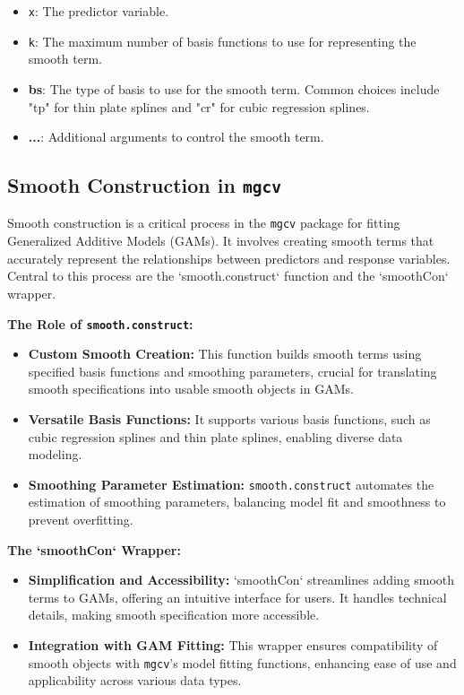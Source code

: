 \documentclass[12pt, twoside,hidelinks]{article}
\theoremstyle{definition}
\numberwithin{equation}{section}
\begin{document}
\begin{itemize}
  \item \texttt{x}: The predictor variable.
  \item \texttt{k}: The maximum  number of basis functions to use for representing the smooth term.
  \item \textbf{bs}: The type of basis to use for the smooth term. Common choices include "tp" for thin plate splines and "cr" for cubic regression splines.
  \item \textbf{...}: Additional arguments to control the smooth term.
\end{itemize}


\subsection{Smooth Construction in \texttt{mgcv}}

Smooth construction is a critical process in the \texttt{mgcv} package for fitting Generalized Additive Models (GAMs). It involves creating smooth terms that accurately represent the relationships between predictors and response variables. Central to this process are the `smooth.construct` function and the `smoothCon` wrapper.

\textbf{The Role of \texttt{smooth.construct}:}
\begin{itemize}
    \item \textbf{Custom Smooth Creation:} This function builds smooth terms using specified basis functions and smoothing parameters, crucial for translating smooth specifications into usable smooth objects in GAMs.
    
    \item \textbf{Versatile Basis Functions:} It supports various basis functions, such as cubic regression splines and thin plate splines, enabling diverse data modeling.
    
    \item \textbf{Smoothing Parameter Estimation:} \texttt{smooth.construct} automates the estimation of smoothing parameters, balancing model fit and smoothness to prevent overfitting.
\end{itemize}

\textbf{The `smoothCon` Wrapper:}
\begin{itemize}
    \item \textbf{Simplification and Accessibility:} `smoothCon` streamlines adding smooth terms to GAMs, offering an intuitive interface for users. It handles technical details, making smooth specification more accessible.
    
    \item \textbf{Integration with GAM Fitting:} This wrapper ensures compatibility of smooth objects with \texttt{mgcv}'s model fitting functions, enhancing ease of use and applicability across various data types.
\end{itemize}
\end{document}
